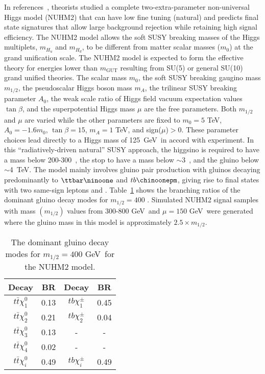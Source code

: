 In references~\cite{Baer:2013xua,Baer:2013yha,Baer:2016usl}, 
theorists studied a complete two-extra-parameter non-universal Higgs model (NUHM2) 
that can have low fine tuning (natural) and
predicts final state signatures that allow large background rejection while retaining high 
signal efficiency. 
The NUHM2 model allows the soft SUSY breaking masses of the Higgs multiplets, $m_{H_{u}}$ and $m_{H_{d}}$, to be different from 
matter scalar masses ($m_{0}$) at the grand unification scale. The NUHM2 model is expected to form the effective theory for energies 
lower than $m_\textrm{GUT}$ resulting from SU(5) or general SU(10) grand unified theories.
The scalar mass $m_{0}$, the soft SUSY breaking gaugino mass $m_{1/2}$, the pseudoscalar Higgs boson mass $m_{A}$, the trilinear SUSY breaking parameter $A_{0}$, the weak scale ratio of Higgs field vacuum expectation values $\tan\beta$, and the superpotential Higgs mass $\mu$ are the free parameters.
Both $m_{1/2}$ and $\mu$ are varied while the other parameters are fixed to $m_{0} = 5$ TeV, $A_{0} = -1.6m_{0}$, $\tan\beta = 15$, $m_{A} = 1$ TeV, and sign($\mu$)$>$0. 
These parameter choices lead directly to a Higgs mass of 125~GeV~in accord with experiment.  In this ``radiatively-driven natural'' SUSY approach, the higgsino is
required to have a mass below 200-300~\GeV, the stop to have a mass below
$\sim$3~\TeV, and the gluino below $\sim$4~TeV.
The model mainly involves gluino pair production with gluinos decaying 
predominantly to $\ttbar\ninoone$ and $tb\chinoonepm$, giving rise to final 
states with two same-sign leptons and \met.
Table~\ref{tab:NUHM2} shows the branching ratios of the dominant gluino decay modes for $m_{1/2} = 400$ \GeV.
Simulated NUHM2 signal samples with mass $(m_{1/2})$ values from 300-800 GeV~and $\mu = 150$ GeV~were generated where 
the gluino mass in this model is approximately $2.5\times m_{1/2}$.

\begin{table}[t!]
\begin{center}
\begin{tabular}{|c|c||c|c|}
\hline
\hline
Decay & BR & Decay & BR\\
\hline
$t\bar{t}\chi^{0}_{1}$ & 0.13 & $tb\chi^{\pm}_{1}$ & 0.45\\
$t\bar{t}\chi^{0}_{2}$ & 0.21 & $tb\chi^{\pm}_{2}$ & 0.04\\
$t\bar{t}\chi^{0}_{3}$ & 0.13 & - & - \\
$t\bar{t}\chi^{0}_{4}$ & 0.02 & - & - \\
\hline
$t\bar{t}\chi^{0}_{i}$ & 0.49 & $tb\chi^{\pm}_{i}$ & 0.49\\
\hline
\hline
\end{tabular}
\caption{The dominant gluino decay modes for $m_{1/2} = 400$ GeV~for the NUHM2 model.}
\label{tab:NUHM2}
\end{center}
\end{table}
